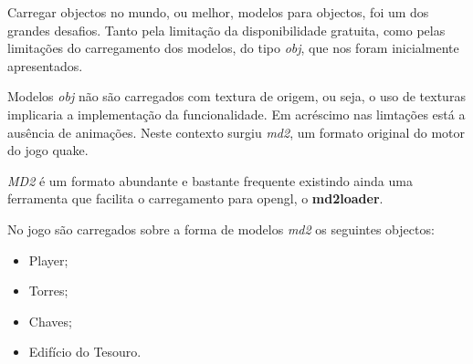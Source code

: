 


Carregar objectos no mundo, ou melhor, modelos para objectos, foi um dos grandes desafios. Tanto pela limitação da disponibilidade gratuita, como pelas limitações do carregamento dos modelos, do tipo \textit{obj}, que nos foram inicialmente apresentados.

Modelos \textit{obj} não são carregados com textura de origem, ou seja, o uso de texturas implicaria a implementação da funcionalidade. Em acréscimo nas limtações está a ausência de animações.
Neste contexto surgiu \textit{md2}, um formato original do motor do jogo quake.

\textit{MD2} é um formato abundante e bastante frequente existindo ainda uma ferramenta que facilita o carregamento para opengl, o {\bf md2loader}.

No jogo são carregados sobre a forma de modelos \textit{md2} os seguintes objectos:
\begin{itemize}
\item Player;
\item Torres;
\item Chaves;
\item Edifício do Tesouro.
\end{itemize}

